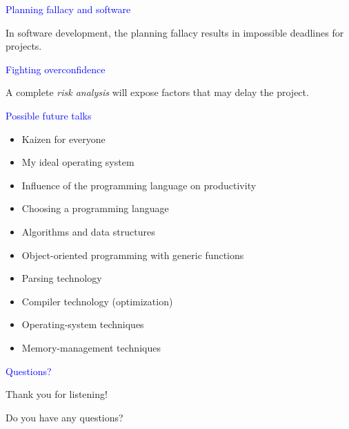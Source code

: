 \documentclass{slides}
\newcommand{\ti}[1]{\begin{center}\Large{\textcolor{blue}{#1}}\end{center}}
\begin{document}
\begin{slide}\ti{Planning fallacy and software}

In software development, the planning fallacy results in impossible
deadlines for projects.

\vfill\end{slide}
\begin{slide}\ti{Fighting overconfidence}

A complete \emph{risk analysis} will expose factors that may delay the
project.

\vfill\end{slide}
\begin{slide}\ti{Possible future talks}

{\small
  \begin{itemize}
  \item Kaizen for everyone
  \item My ideal operating system
  \item Influence of the programming language on productivity
  \item Choosing a programming language
  \item Algorithms and data structures
  \item Object-oriented programming with generic functions
  \item Parsing technology
  \item Compiler technology (optimization)
  \item Operating-system techniques
  \item Memory-management techniques
  \end{itemize}}

\vfill\end{slide}
\begin{slide}\ti{Questions?}

Thank you for listening!

Do you have any questions?

\vfill\end{slide}



\end{document}
